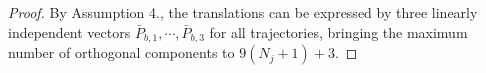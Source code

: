 \documentclass[10pt,a4paper]{amsart}
\begin{document}
\begin{proof}
    By Assumption 4., the translations can be expressed by three linearly independent vectors $\bar{P}_{b,1},\cdots, \bar{P}_{b,3}$ for all trajectories, bringing the maximum number of orthogonal components to $9(N_j+1)+3$. 








\end{proof}
\end{document}

